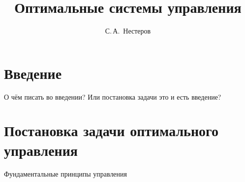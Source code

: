 \documentclass[article,russian,a5paper,10pt,twoside]{ncc}
\begin{document}
\begin{titlepage}
	\title{Оптимальные системы управления}
	\author{С.\,А.~Нестеров}
	\maketitle
\end{titlepage}

\section{Введение\label{intro}}

О чём писать во введении? Или постановка задачи это и есть введение?

\section{Постановка задачи оптимального управления\label{task}}

Фундаментальные принципы управления
\end{document}
